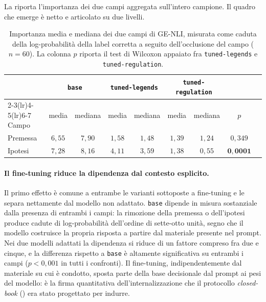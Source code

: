 \documentclass[pdflatex, sn-apa]{sn-jnl}%
\theoremstyle{thmstyleone}%
\theoremstyle{thmstyletwo}%
\theoremstyle{thmstylethree}%
\newcommand{\modelbase}{\texttt{base}}
\newcommand{\modellegends}{\texttt{tuned-legends}}
\newcommand{\modelreg}{\texttt{tuned-regulation}}
\begin{document}
La  riporta l'importanza dei due campi aggregata sull'intero
campione. Il quadro che emerge è netto e articolato su due livelli.

\begin{table}[h]
\centering
\caption{Importanza media e mediana dei due campi di GE-NLI, misurata come caduta
della log-probabilità della label corretta a seguito dell'occlusione del campo
($n=60$). La colonna $p$ riporta il test di Wilcoxon appaiato fra \modellegends{}
e \modelreg{}.}
\label{tab:xai_fields}
\small
\begin{tabular}{@{}lcccccccc@{}}
\toprule
& \multicolumn{2}{c}{\modelbase} & \multicolumn{2}{c}{\modellegends} & \multicolumn{2}{c}{\modelreg} & \\
\cmidrule(lr){2-3}\cmidrule(lr){4-5}\cmidrule(lr){6-7}
Campo & media & mediana & media & mediana & media & mediana & $p$ \\
\midrule
Premessa & $6{,}55$ & $7{,}90$ & $1{,}58$ & $1{,}48$ & $1{,}39$ & $1{,}24$ & $0{,}349$ \\
Ipotesi  & $7{,}28$ & $8{,}16$ & $4{,}11$ & $3{,}59$ & $1{,}38$ & $0{,}55$ & $\mathbf{0{,}0001}$ \\
\bottomrule
\end{tabular}
\end{table}

\paragraph{Il fine-tuning riduce la dipendenza dal contesto esplicito.}
Il primo effetto è comune a entrambe le varianti sottoposte a fine-tuning e le
separa nettamente dal modello non adattato. \modelbase{} dipende in misura
sostanziale dalla presenza di entrambi i campi: la rimozione della premessa o
dell'ipotesi produce cadute di log-probabilità dell'ordine di sette-otto unità,
segno che il modello costruisce la propria risposta a partire dal materiale
presente nel prompt. Nei due modelli adattati la dipendenza si riduce di un
fattore compreso fra due e cinque, e la differenza rispetto a \modelbase{} è
altamente significativa su entrambi i campi ($p < 0{,}001$ in tutti i confronti).
Il fine-tuning, indipendentemente dal materiale su cui è condotto, sposta parte
della base decisionale dal prompt ai pesi del modello: è la firma quantitativa
dell'internalizzazione che il protocollo \emph{closed-book} ()
era stato progettato per indurre.
\end{document}
